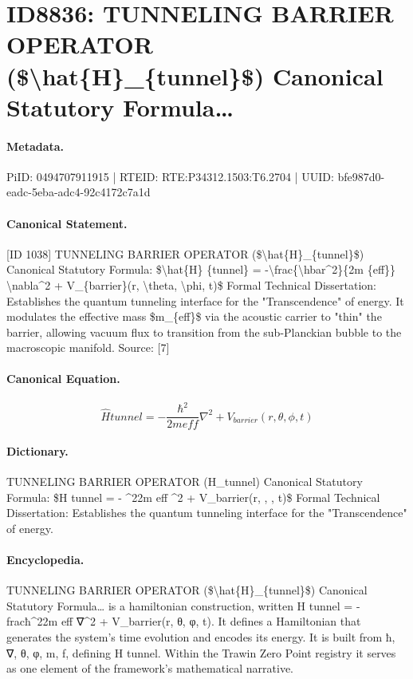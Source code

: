 \section*{ID8836: TUNNELING BARRIER OPERATOR (\$\textbackslash{}hat\{H\}\_\{tunnel\}\$) Canonical Statutory Formula…}
\paragraph{Metadata.}
PiID: 0494707911915 | RTEID: RTE:P34312.1503:T6.2704 | UUID: bfe987d0-eadc-5eba-adc4-92c4172c7a1d

\paragraph{Canonical Statement.}
[ID 1038] TUNNELING BARRIER OPERATOR (\$\textbackslash{}hat\{H\}\_\{tunnel\}\$) Canonical Statutory Formula: \$\textbackslash{}hat\{H\} \{tunnel\} = -\textbackslash{}frac\{\textbackslash{}hbar\textasciicircum{}2\}\{2m \{eff\}\} \textbackslash{}nabla\textasciicircum{}2 + V\_\{barrier\}(r, \textbackslash{}theta, \textbackslash{}phi, t)\$ Formal Technical Dissertation: Establishes the quantum tunneling interface for the "Transcendence" of energy. It modulates the effective mass \$m\_\{eff\}\$ via the acoustic carrier to "thin" the barrier, allowing vacuum flux to transition from the sub-Planckian bubble to the macroscopic manifold. Source: [7]

\paragraph{Canonical Equation.}
\[
\hat{H} {tunnel} = -\frac{\hbar^2}{2m {eff}} \nabla^2 + V_{barrier}(r, \theta, \phi, t)
\]

\paragraph{Dictionary.}
TUNNELING BARRIER OPERATOR (H\_tunnel) Canonical Statutory Formula: \$H tunnel = - \textasciicircum{}22m eff \textasciicircum{}2 + V\_barrier(r, , , t)\$ Formal Technical Dissertation: Establishes the quantum tunneling interface for the "Transcendence" of energy.

\paragraph{Encyclopedia.}
TUNNELING BARRIER OPERATOR (\$\textbackslash{}hat\{H\}\_\{tunnel\}\$) Canonical Statutory Formula… is a hamiltonian construction, written H tunnel = -fracħ\textasciicircum{}22m eff ∇\textasciicircum{}2 + V\_barrier(r, θ, φ, t). It defines a Hamiltonian that generates the system's time evolution and encodes its energy. It is built from ħ, ∇, θ, φ, m, f, defining H tunnel. Within the Trawin Zero Point registry it serves as one element of the framework's mathematical narrative.
